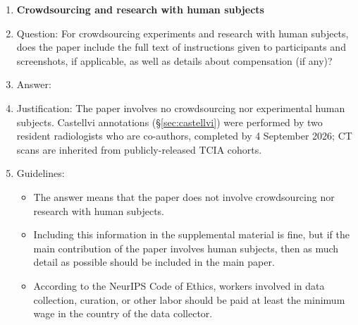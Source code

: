 \begin{enumerate}
\item {\bf Crowdsourcing and research with human subjects}
    \item[] Question: For crowdsourcing experiments and research with human subjects, does the paper include the full text of instructions given to participants and screenshots, if applicable, as well as details about compensation (if any)?
    \item[] Answer: \answerNA{}
    \item[] Justification: The paper involves no crowdsourcing nor experimental human subjects. Castellvi annotations (\S\ref{sec:castellvi}) were performed by two resident radiologists who are co-authors, completed by 4 September 2026; CT scans are inherited from publicly-released TCIA cohorts.
    \item[] Guidelines:
    \begin{itemize}
        \item The answer \answerNA{} means that the paper does not involve crowdsourcing nor research with human subjects.
        \item Including this information in the supplemental material is fine, but if the main contribution of the paper involves human subjects, then as much detail as possible should be included in the main paper.
        \item According to the NeurIPS Code of Ethics, workers involved in data collection, curation, or other labor should be paid at least the minimum wage in the country of the data collector.
    \end{itemize}


\end{enumerate}
